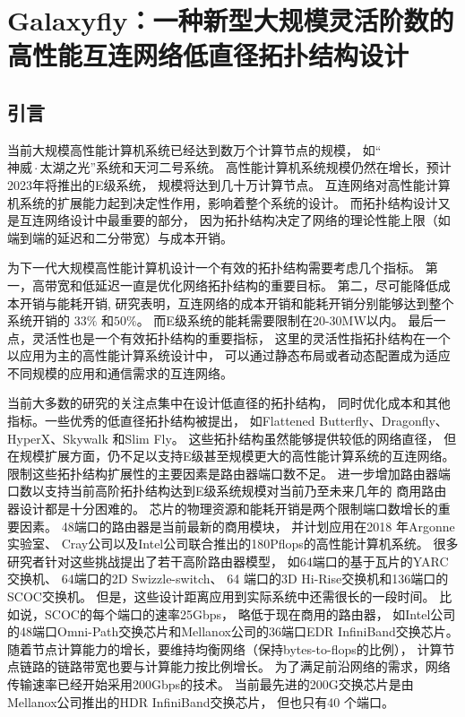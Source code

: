 \chapter{Galaxyfly：一种新型大规模灵活阶数的高性能互连网络低直径拓扑结构设计}

\section{引言}
当前大规模高性能计算机系统已经达到数万个计算节点的规模，
如“$神威\cdot 太湖之光$”系统和天河二号系统。
高性能计算机系统规模仍然在增长，预计2023年将推出的E级系统，
规模将达到几十万计算节点。
互连网络对高性能计算机系统的扩展能力起到决定性作用，影响着整个系统的设计。
而拓扑结构设计又是互连网络设计中最重要的部分，
因为拓扑结构决定了网络的理论性能上限（如端到端的延迟和二分带宽）与成本开销。

为下一代大规模高性能计算机设计一个有效的拓扑结构需要考虑几个指标。
第一，高带宽和低延迟一直是优化网络拓扑结构的重要目标。
第二，尽可能降低成本开销与能耗开销,
研究表明，互连网络的成本开销和能耗开销分别能够达到整个系统开销的
$33\%$ 和$50\%$。
而E级系统的能耗需要限制在20-30MW以内。
最后一点，灵活性也是一个有效拓扑结构的重要指标，
这里的灵活性指拓扑结构在一个以应用为主的高性能计算系统设计中，
可以通过静态布局或者动态配置成为适应不同规模的应用和通信需求的互连网络。

当前大多数的研究的关注点集中在设计低直径的拓扑结构，
同时优化成本和其他指标。一些优秀的低直径拓扑结构被提出，
如Flattened Butterfly、Dragonfly、
HyperX、Skywalk 和Slim Fly。
这些拓扑结构虽然能够提供较低的网络直径，
但在规模扩展方面，仍不足以支持E级甚至规模更大的高性能计算系统的互连网络。
限制这些拓扑结构扩展性的主要因素是路由器端口数不足。
进一步增加路由器端口数以支持当前高阶拓扑结构达到E级系统规模对当前乃至未来几年的
商用路由器设计都是十分困难的。
芯片的物理资源和能耗开销是两个限制端口数增长的重要因素。
48端口的路由器是当前最新的商用模块，
并计划应用在2018 年Argonne实验室、
Cray公司以及Intel公司联合推出的180Pflops的高性能计算机系统。
很多研究者针对这些挑战提出了若干高阶路由器模型，
如64端口的基于瓦片的YARC交换机、
64端口的2D Swizzle-switch、
64 端口的3D Hi-Rise交换机和136端口的SCOC交换机。
但是，这些设计距离应用到实际系统中还需很长的一段时间。
比如说，SCOC的每个端口的速率25Gbps，
略低于现在商用的路由器，
如Intel公司的48端口Omni-Path交换芯片和Mellanox公司的36端口EDR InfiniBand交换芯片。
随着节点计算能力的增长，要维持均衡网络（保持bytes-to-flops的比例），
计算节点链路的链路带宽也要与计算能力按比例增长。
为了满足前沿网络的需求，网络传输速率已经开始采用200Gbps的技术。
当前最先进的200G交换芯片是由Mellanox公司推出的HDR InfiniBand交换芯片，
但也只有40 个端口。

